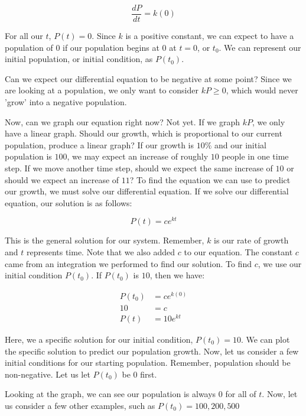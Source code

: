 \documentclass{amsart}
\theoremstyle{definition}
\numberwithin{equation}{section}
\begin{document}
\begin{sansmath}
\[ \frac{dP}{dt} = k(0)\]

For all our $t$, $P(t) = 0$. Since $k$ is a positive constant, we can expect to have a population of $0$ if our population begins at $0$ at $t = 0$, or $t_0$. We can represent our initial population, or initial condition, as $P(t_0)$.

Can we expect our differential equation to be negative at some point? Since we are looking at a population, we only want to consider $kP \geq 0$, which would never 'grow' into a negative population.

Now, can we graph our equation right now? Not yet. If we graph $kP$, we only have a linear graph. Should our growth, which is proportional to our current population, produce a linear graph? If our growth is $10\%$ and our initial population is $100$, we may expect an increase of roughly $10$ people in one time step. If we move another time step, should we expect the same increase of $10$ or should we expect an increase of $11$? To find the equation we can use to predict our growth, we must solve our differential equation. If we solve our differential equation, our solution is as follows:

\[ P(t) = ce^{kt} \]


This is the general solution for our system. Remember, $k$ is our rate of growth and $t$ represents time. Note that we also added $c$ to our equation. The constant $c$ came from an integration we performed to find our solution. To find $c$, we use our initial condition $P(t_0)$. If $P(t_0)$ is $10$, then we have:

\begin{align*}
  P(t_0) & = ce^{k(0)}\\
  10 & = c\\
  P(t) & = 10e^{kt}
\end{align*}

Here, we a specific solution for our initial condition, $P(t_0) = 10$. We can plot the specific solution to predict our population growth. Now, let us consider a few initial conditions for our starting population. Remember, population should be non-negative. Let us let $P(t_0)$ be $0$ first.


Looking at the graph, we can see our population is always $0$ for all of $t$. Now, let us consider a few other examples, such as $P(t_0) = 100, 200, 500$



\end{sansmath}
\end{document}
